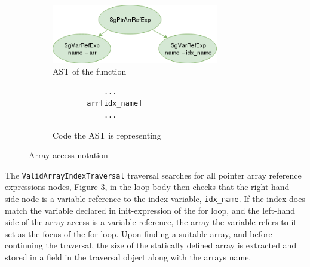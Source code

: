 \documentclass[bsc,frontabs,singlespacing,twoside,parskip,deptreport]{infthesis}
\begin{document}
\begin{figure}[H]
    \begin{subfigure}[b]{0.6\textwidth}
        \centering
        \includegraphics[width=0.8\textwidth]{images/ArrPtrAcc.png}
        \caption{AST of the function}
        \label{fig:arr-acc-AST}
    \end{subfigure}
    \hfill
    \begin{subfigure}[b]{0.4\textwidth}
        \centering
        \begin{verbatim}
            ...
        arr[idx_name]
            ...
        \end{verbatim}
        \caption{Code the AST is representing}
        \label{fig:arr-acc-code}
    \end{subfigure}
    \vspace{-0.5cm}
    \caption{Array access notation}
    \label{fig:arr-access}
\end{figure}

The \texttt{ValidArrayIndexTraversal} traversal searches for all pointer array reference expressions nodes, Figure \ref{fig:arr-access}, in the loop body then checks that the right hand side node is a variable reference to the index variable, \texttt{idx\_name}. If the index does match the variable declared in init-expression of the for loop, and the left-hand side of the array access is a variable reference, the array the variable refers to it set as the focus of the for-loop. Upon finding a suitable array, and before continuing the traversal, the size of the statically defined array is extracted and stored in a field in the traversal object along with the arrays name. 
\end{document}
